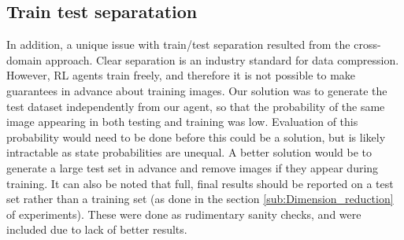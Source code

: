 \subsection{Train test separatation}
In addition, a unique issue with train/test separation resulted from the
cross-domain approach. Clear separation is an industry standard for data
compression. However, RL agents train freely, and therefore it is not
possible to make guarantees in advance about training images. Our solution was to generate the test dataset independently from our agent,
so that the probability of the same image appearing in both testing and training
was low. Evaluation of this probability would need to be done before this could
be a solution, but is likely intractable as state probabilities are unequal. A
better solution would be to generate a large test set in advance and remove
images if they appear during training. It can also be noted that full, final
results should be reported on a test set rather than a training set (as done in
the section \ref{sub:Dimension_reduction} of experiments). These were done as rudimentary
sanity checks, and were included due to lack of better results.
